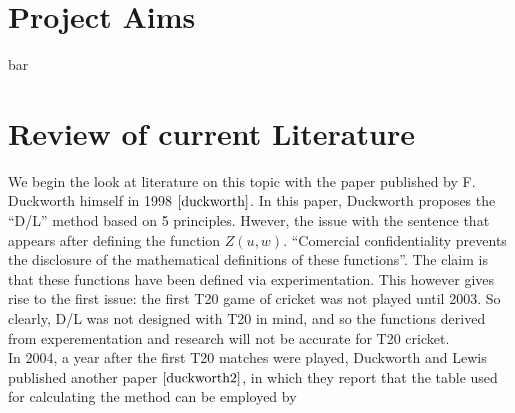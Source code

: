 \section{Project Aims}
bar

\section{Review of current Literature}
We begin the look at literature on this topic with the paper published by F. Duckworth himself in 1998 $\cite{duckworth}$. In this paper, 
Duckworth proposes the ``D/L'' method based on 5 principles. Hwever, the issue with the sentence that appears after defining the function $Z(u,w)$.
``Comercial confidentiality prevents the disclosure of the mathematical definitions of these functions''. The claim is that these functions have been 
defined via experimentation. This however gives rise to the first issue: the first T20 game of cricket was not played until 2003. So clearly, D/L was not
designed with T20 in mind, and so the functions derived from experementation and research will not be accurate for T20 cricket. \\

In 2004, a year after the first T20 matches were played, Duckworth and Lewis published another paper $\cite{duckworth2}$, in which they report
that the table used for calculating the method can be employed by 
